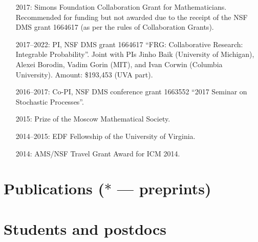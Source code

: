 \documentclass[letterpaper,11pt]{article}
\begin{document}
\begin{itemize}
		
	\item
	      [2017:] Simons Foundation Collaboration Grant for
	      Mathematicians. Recommended for funding but not awarded due to
	      the receipt of the NSF DMS grant 1664617 (as per the rules of Collaboration
	      Grants).
	\item
			[2017--2022:] PI, NSF DMS grant 1664617
	      ``FRG: Collaborative Research: Integrable Probability''.
	      Joint with PIs Jinho Baik (University of Michigan), Alexei
	      Borodin, Vadim Gorin (MIT), and Ivan Corwin (Columbia University). Amount:
	      \$193,453 (UVA part).
	\item
		[2016--2017:] Co-PI,
	      NSF DMS conference grant 1663552 ``2017 Seminar on Stochastic
				Processes''.
	\item
	      [2015:] Prize of the Moscow Mathematical Society.
	\item
	      [2014--2015:] EDF Fellowship of the University of Virginia.
	\item
	      [2014:] AMS/NSF Travel Grant Award for ICM 2014.
\end{itemize}

\section*{Publications ($*$ --- preprints)}



\section*{Students and postdocs}
\end{document}
